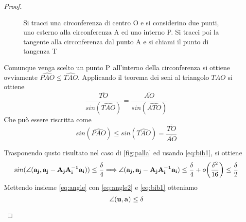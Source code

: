 \documentclass[a4paper]{book}
\begin{document}
\begin{proof}
\begin{itemize}
\begin{figure}[h!]
\centering
{}
\caption{Si tracci una circonferenza di centro O e si considerino due punti, uno esterno alla circonferenza A ed uno interno P. Si tracci poi la tangente alla circonferenza dal punto A e si chiami il punto di tangenza T}
\label{fig:triangolo3}
\end{figure}


Comunque venga scelto un punto $ \rm P$ all'interno della circonferenza si ottiene ovviamente $ \widehat{PAO} \leq \widehat{TAO} $. 
Applicando il teorema dei seni al triangolo $TAO$  si ottiene
\[ \frac{\overline{TO}}{sin( \widehat{TAO}) } = \frac{\overline{AO}}{sin( \widehat{ATO}) } \]
Che può essere riscritta come 
\begin{equation}
\label{eq:seni}
sin(\widehat{PAO}) \leq sin( \widehat{TAO})= \frac{\overline{TO}}{\overline{AO}}
\end{equation}

Trasponendo qusto risultato nel caso di \ref{fig:palla} ed usando \ref{eq:bib1}, si ottiene 
\begin{equation}
\label{eq:angle2}
sin(\angle(\vb{a_j}, \vb{a_j- A_j A_i^{-1} a_i} ) ) \leq \frac{\delta}{4} \Longrightarrow \angle(\vb{a_j}, \vb{a_j- A_j A_i^{-1} a_i} ) \leq \frac{\delta}{4} + o \bigg( \frac{\delta^2}{16} \bigg) \leq \frac{\delta}{2}
\end{equation}
Mettendo insieme \ref{eq:angle} con \ref{eq:angle2} e \ref{eq:bib1} otteniamo
\[ \angle (\vb{u, a}) \leq \delta \]
\end{itemize}


\end{proof}
\end{document}
